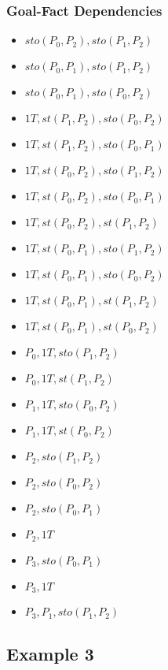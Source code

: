 
\FloatBarrier
\subsubsection*{Goal-Fact Dependencies}

\begin{itemize}
	\item $sto(P_0,P_2),sto(P_1,P_2)$
	\item $sto(P_0,P_1),sto(P_1,P_2)$
	\item $sto(P_0,P_1),sto(P_0,P_2)$
	\item $1T,st(P_1,P_2),sto(P_0,P_2)$
	\item $1T,st(P_1,P_2),sto(P_0,P_1)$
	\item $1T,st(P_0,P_2),sto(P_1,P_2)$
	\item $1T,st(P_0,P_2),sto(P_0,P_1)$
	\item $1T,st(P_0,P_2),st(P_1,P_2)$
	\item $1T,st(P_0,P_1),sto(P_1,P_2)$
	\item $1T,st(P_0,P_1),sto(P_0,P_2)$
	\item $1T,st(P_0,P_1),st(P_1,P_2)$
	\item $1T,st(P_0,P_1),st(P_0,P_2)$
	\item $P_0,1T,sto(P_1,P_2)$
	\item $P_0,1T,st(P_1,P_2)$
	\item $P_1,1T,sto(P_0,P_2)$
	\item $P_1,1T,st(P_0,P_2)$
	\item $P_2,sto(P_1,P_2)$
	\item $P_2,sto(P_0,P_2)$
	\item $P_2,sto(P_0,P_1)$
	\item $P_2,1T$
	\item $P_3,sto(P_0,P_1)$
	\item $P_3,1T$
	\item $P_3,P_1,sto(P_1,P_2)$
\end{itemize}

\newpage
\subsection*{Example 3}

